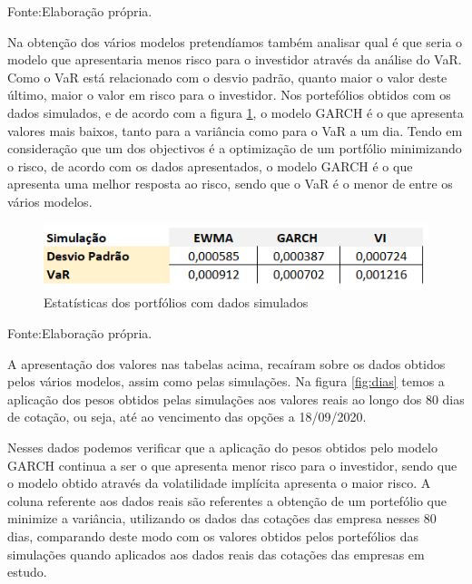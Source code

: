 \documentclass[
  12pt,
  a4paper,
  openany]{book}
\theoremstyle{definition}
\theoremstyle{definition}
\theoremstyle{definition}
\theoremstyle{remark}
\begin{document}
Fonte:Elaboração própria.

\justifying
\bigskip

Na obtenção dos vários modelos pretendíamos também analisar qual é que seria o modelo que apresentaria menos risco para o investidor através da análise do VaR. Como o VaR está relacionado com o desvio padrão, quanto maior o valor deste último, maior o valor em risco para o investidor. Nos portefólios obtidos com os dados simulados, e de acordo com a figura \ref{fig:umsim}, o modelo GARCH é o que apresenta valores mais baixos, tanto para a variância como para o VaR a um dia. Tendo em consideração que um dos objectivos é a optimização de um portfólio minimizando o risco, de acordo com os dados apresentados, o modelo GARCH é o que apresenta uma melhor resposta ao risco, sendo que o VaR é o menor de entre os vários modelos.

\begin{figure}

{\centering \includegraphics[width=0.8\linewidth]{image/simulação} 

}

\caption{Estatísticas dos portfólios com dados simulados}\label{fig:umsim}
\end{figure}
\FloatBarrier
\centering

Fonte:Elaboração própria.

\justifying
\bigskip

A apresentação dos valores nas tabelas acima, recaíram sobre os dados obtidos pelos vários modelos, assim como pelas simulações. Na figura \ref{fig:dias} temos a aplicação dos pesos obtidos pelas simulações aos valores reais ao longo dos 80 dias de cotação, ou seja, até ao vencimento das opções a 18/09/2020.

Nesses dados podemos verificar que a aplicação do pesos obtidos pelo modelo GARCH continua a ser o que apresenta menor risco para o investidor, sendo que o modelo obtido através da volatilidade implícita apresenta o maior risco. A coluna referente aos dados reais são referentes a obtenção de um portefólio que minimize a variância, utilizando os dados das cotações das empresa nesses 80 dias, comparando deste modo com os valores obtidos pelos portefólios das simulações quando aplicados aos dados reais das cotações das empresas em estudo.
\end{document}
